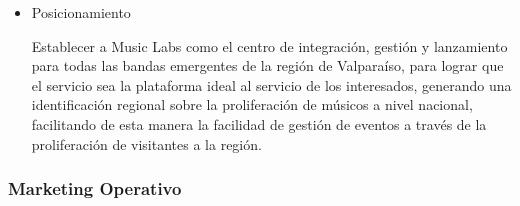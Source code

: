 \begin{itemize}
\begin{itemize}
\end{itemize}

\item{Posicionamiento}

Establecer a Music Labs como el centro de integración, gestión y lanzamiento para todas las bandas emergentes de la región de Valparaíso, para lograr que el servicio sea la plataforma ideal al servicio de los interesados, generando una identificación regional sobre la proliferación de músicos a nivel nacional, facilitando de esta manera la facilidad de gestión de eventos a través de la proliferación de visitantes a la región.

\end{itemize}

\subsubsection{Marketing Operativo}

